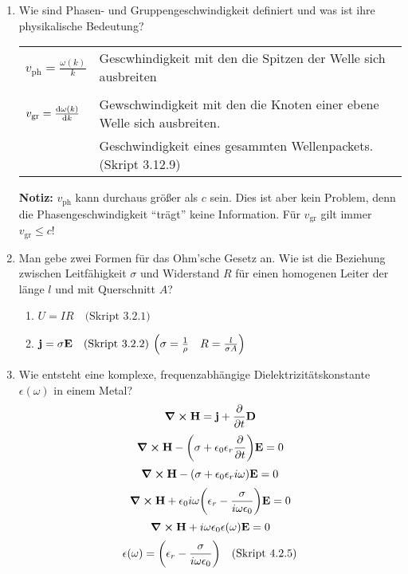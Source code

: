 \documentclass{scrartcl}
\newcommand{\sref}[1]{(Skript #1)}
\newcommand{\smref}[1]{\quad\text{(Skript #1)}}
\begin{document}
\begin{enumerate}
    \item Wie sind Phasen- und Gruppengeschwindigkeit definiert und was ist
          ihre physikalische Bedeutung?
          \begin{center}
            \begin{tabular}{ll}
              $v_{\text{ph}}=\frac{\omega(k)}{k}$ 
                        &Gescwhindigkeit mit 
                         den die Spitzen der Welle sich ausbreiten 
                         \\\\
              $v_{\text{gr}}=\dv{\omega(k)}{k}$
                        &Gewschwindigkeit mit
                         den die Knoten einer ebene Welle sich ausbreiten.\\
                        &Geschwindigkeit eines gesammten Wellenpackets.
                        \sref{3.12.9}\\
            \end{tabular}
          \end{center}
          \textbf{Notiz:} 
          $v_{\text{ph}}$ kann durchaus größer als $c$ sein. Dies ist aber
          kein Problem, denn die Phasengeschwindigkeit ``trägt'' keine
          Information. Für $v_{\text{gr}}$ gilt immer $v_{\text{gr}}\le c$!

    \item Man gebe zwei Formen für das Ohm'sche Gesetz an. Wie ist die
          Beziehung zwischen Leitfähigkeit $\sigma$ und Widerstand $R$ 
          für einen homogenen Leiter der länge $l$ und mit 
          Querschnitt $A$?
          \begin{enumerate}
            \item $U=IR\smref{3.2.1}$
            \item $\vb j= \sigma \vb E\smref{3.2.2}$ 
              $\qty(\sigma=\frac{1}{\rho}\quad R=\frac{l}{\sigma A})$
          \end{enumerate}

    \item Wie entsteht eine komplexe, frequenzabhängige 
          Dielektrizitätskonstante $\epsilon(\omega)$ in einem Metal?
          $$\curl \vb H = \vb j + \pdv{t}\vb D$$
          $$\curl \vb H -\qty(\sigma +\epsilon_0\epsilon_r\pdv{t})\vb E=0$$
          $$\curl \vb H -\qty(\sigma +\epsilon_0\epsilon_ri\omega)\vb E=0$$
          $$\curl \vb H +\epsilon_0 i\omega
          \qty(\epsilon_r-\frac{\sigma}{i\omega\epsilon_0})\vb E=0$$
          $$\curl \vb H +i\omega\epsilon_0 \epsilon(\omega)\vb E=0$$
          $$\epsilon(\omega)=\qty(\epsilon_r-\frac{\sigma}
          {i\omega\epsilon_0})\smref{4.2.5}$$


\end{enumerate}
\end{document}
